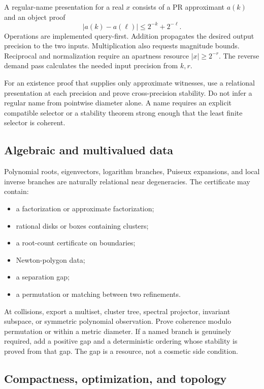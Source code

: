 A regular-name presentation for a real \(x\) consists of a PR approximant
\(a(k)\) and an object proof
\[
  |a(k)-a(\ell)|\le 2^{-k}+2^{-\ell}.
\]
Operations are implemented query-first.  Addition propagates the desired
output precision to the two inputs.  Multiplication also requests magnitude
bounds.  Reciprocal and normalization require an apartness resource
\(|x|\ge2^{-r}\).  The reverse demand pass calculates the needed input
precision from \(k,r\).

For an existence proof that supplies only approximate witnesses, use a
relational presentation at each precision and prove cross-precision stability.
Do not infer a regular name from pointwise diameter alone.  A name requires an
explicit compatible selector or a stability theorem strong enough that the
least finite selector is coherent.

\subsection{Algebraic and multivalued data}

Polynomial roots, eigenvectors, logarithm branches, Puiseux expansions, and
local inverse branches are naturally relational near degeneracies.  The
certificate may contain:

\begin{itemize}
\item a factorization or approximate factorization;
\item rational disks or boxes containing clusters;
\item a root-count certificate on boundaries;
\item Newton-polygon data;
\item a separation gap;
\item a permutation or matching between two refinements.
\end{itemize}

At collisions, export a multiset, cluster tree, spectral projector, invariant
subspace, or symmetric polynomial observation.  Prove coherence modulo
permutation or within a metric diameter.  If a named branch is genuinely
required, add a positive gap and a deterministic ordering whose stability is
proved from that gap.  The gap is a resource, not a cosmetic side condition.

\subsection{Compactness, optimization, and topology}

